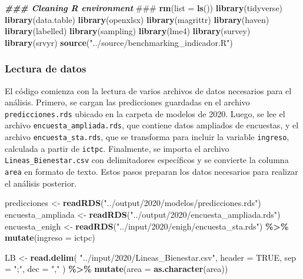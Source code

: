 \documentclass[
  12pt,
]{book}
\newenvironment{Shaded}{\begin{snugshade}}{\end{snugshade}}
\newcommand{\AlertTok}[1]{\textcolor[rgb]{0.94,0.16,0.16}{#1}}
\newcommand{\AttributeTok}[1]{\textcolor[rgb]{0.13,0.29,0.53}{#1}}
\newcommand{\ConstantTok}[1]{\textcolor[rgb]{0.56,0.35,0.01}{#1}}
\newcommand{\DocumentationTok}[1]{\textcolor[rgb]{0.56,0.35,0.01}{\textbf{\textit{#1}}}}
\newcommand{\FunctionTok}[1]{\textcolor[rgb]{0.13,0.29,0.53}{\textbf{#1}}}
\newcommand{\NormalTok}[1]{#1}
\newcommand{\OtherTok}[1]{\textcolor[rgb]{0.56,0.35,0.01}{#1}}
\newcommand{\SpecialCharTok}[1]{\textcolor[rgb]{0.81,0.36,0.00}{\textbf{#1}}}
\newcommand{\StringTok}[1]{\textcolor[rgb]{0.31,0.60,0.02}{#1}}
\begin{document}
\begin{Shaded}
\begin{Highlighting}[]
\DocumentationTok{\#\#\# Cleaning R environment }\AlertTok{\#\#\#}
\FunctionTok{rm}\NormalTok{(}\AttributeTok{list =} \FunctionTok{ls}\NormalTok{())}
\FunctionTok{library}\NormalTok{(tidyverse)}
\FunctionTok{library}\NormalTok{(data.table)}
\FunctionTok{library}\NormalTok{(openxlsx)}
\FunctionTok{library}\NormalTok{(magrittr)}
\FunctionTok{library}\NormalTok{(haven)}
\FunctionTok{library}\NormalTok{(labelled)}
\FunctionTok{library}\NormalTok{(sampling)}
\FunctionTok{library}\NormalTok{(lme4)}
\FunctionTok{library}\NormalTok{(survey)}
\FunctionTok{library}\NormalTok{(srvyr)}
\FunctionTok{source}\NormalTok{(}\StringTok{"../source/benchmarking\_indicador.R"}\NormalTok{)}
\end{Highlighting}
\end{Shaded}

\hypertarget{lectura-de-datos-4}{%
\subsubsection*{Lectura de datos}\label{lectura-de-datos-4}}

El código comienza con la lectura de varios archivos de datos necesarios para el análisis. Primero, se cargan las predicciones guardadas en el archivo \texttt{predicciones.rds} ubicado en la carpeta de modelos de 2020. Luego, se lee el archivo \texttt{encuesta\_ampliada.rds}, que contiene datos ampliados de encuestas, y el archivo \texttt{encuesta\_sta.rds}, que se transforma para incluir la variable \texttt{ingreso}, calculada a partir de \texttt{ictpc}. Finalmente, se importa el archivo \texttt{Lineas\_Bienestar.csv} con delimitadores específicos y se convierte la columna \texttt{area} en formato de texto. Estos pasos preparan los datos necesarios para realizar el análisis posterior.

\begin{Shaded}
\begin{Highlighting}[]
\NormalTok{predicciones }\OtherTok{\textless{}{-}} \FunctionTok{readRDS}\NormalTok{(}\StringTok{"../output/2020/modelos/predicciones.rds"}\NormalTok{)}
\NormalTok{encuesta\_ampliada }\OtherTok{\textless{}{-}} \FunctionTok{readRDS}\NormalTok{(}\StringTok{"../output/2020/encuesta\_ampliada.rds"}\NormalTok{)}
\NormalTok{encuesta\_enigh }\OtherTok{\textless{}{-}} \FunctionTok{readRDS}\NormalTok{(}\StringTok{"../input/2020/enigh/encuesta\_sta.rds"}\NormalTok{) }\SpecialCharTok{\%\textgreater{}\%}
  \FunctionTok{mutate}\NormalTok{(}\AttributeTok{ingreso =}\NormalTok{ ictpc)}

\NormalTok{LB }\OtherTok{\textless{}{-}} \FunctionTok{read.delim}\NormalTok{(}
  \StringTok{"../input/2020/Lineas\_Bienestar.csv"}\NormalTok{,}
  \AttributeTok{header =} \ConstantTok{TRUE}\NormalTok{,}
  \AttributeTok{sep =} \StringTok{";"}\NormalTok{,}
  \AttributeTok{dec =} \StringTok{","}
\NormalTok{) }\SpecialCharTok{\%\textgreater{}\%} \FunctionTok{mutate}\NormalTok{(}\AttributeTok{area =} \FunctionTok{as.character}\NormalTok{(area))}
\end{Highlighting}
\end{Shaded}
\end{document}
